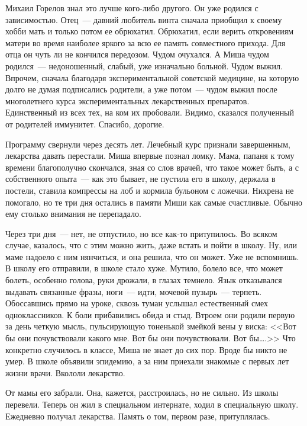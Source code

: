 Михаил Горелов знал это лучше кого-либо другого. Он уже родился с зависимостью. 
Отец~--- давний любитель винта сначала приобщил к своему хобби мать и только 
потом ее обрюхатил. Обрюхатил, если верить откровениям матери во время наиболее 
яркого за всю ее память совместного прихода. Для отца он чуть ли не кончился 
передозом. Чудом очухался. А Миша чудом родился~--- недоношенный, слабый, уже изначально 
больной. Чудом выжил. Впрочем, сначала благодаря экспериментальной советской 
медицине, на которую долго не думая подписались родители, а уже потом~--- чудом 
выжил после многолетнего курса экспериментальных лекарственных препаратов. 
Единственный из всех тех, на ком их пробовали. Видимо, сказался полученный от 
родителей иммунитет. Спасибо, дорогие.


Программу свернули через десять лет. Лечебный курс признали завершенным, 
лекарства давать перестали. Миша впервые познал ломку. Мама, папаня к тому 
времени благополучно скончался, зная со слов врачей, что такое может быть, а с 
собственного опыта~--- как это бывает, не пустила его в школу, держала в 
постели, 
ставила компрессы на лоб и кормила бульоном с ложечки. Нихрена не помогало, но 
те три дня остались в памяти Миши как самые счастливые. Обычно ему столько 
внимания не перепадало.



Через три дня~--- нет, не отпустило, но все как-то притупилось. Во всяком 
случае, 
казалось, что с этим можно жить, даже встать и пойти в школу. Ну, или маме 
надоело с ним нянчиться, и она решила, что он может. Уже не вспомнишь. В школу 
его отправили, в школе стало хуже. Мутило, болело все, что может болеть, 
особенно голова, руки дрожали, в глазах темнело. Язык отказывался выдавать 
связанные фразы, ноги~--- идти, мочевой пузырь~--- терпеть. Обоссавшись прямо 
на 
уроке, сквозь туман услышал естественный смех одноклассников. К боли 
прибавились 
обида и стыд. Втроем они родили первую за день четкую мысль, пульсирующую 
тоненькой змейкой вены у виска: <<Вот бы они почувствовали какого мне. Вот бы 
они 
почувствовали. Вот бы\ldots.>> Что конкретно случилось в классе, Миша не знает 
до 
сих пор. Вроде бы никто не умер. В школе объявили эпидемию, а за ним приехали 
знакомые с первых лет жизни врачи. Вкололи лекарство.



От мамы его забрали. Она, кажется, расстроилась, но не сильно. Из школы 
перевели. Теперь он жил в специальном интернате, ходил в специальную школу. 
Ежедневно получал лекарства. Память о том, первом разе, притуплялась.



